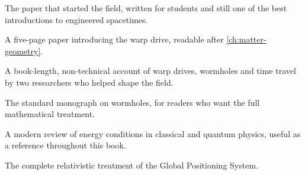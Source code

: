 \begin{furtherreading}
\item[\textcite{Morris1988a}] The paper that started the field, written for
  students and still one of the best introductions to engineered spacetimes.
\item[\textcite{Alcubierre1994}] A five-page paper introducing the warp drive,
  readable after \cref{ch:matter-geometry}.
\item[\textcite{Everett2011}] A book-length, non-technical account of warp
  drives, wormholes and time travel by two researchers who helped shape the
  field.
\item[\textcite{Visser1995b}] The standard monograph on wormholes, for readers
  who want the full mathematical treatment.
\item[\textcite{Kontou2020}] A modern review of energy conditions in classical
  and quantum physics, useful as a reference throughout this book.
\item[\textcite{Ashby2003}] The complete relativistic treatment of the Global
  Positioning System.
\end{furtherreading}
